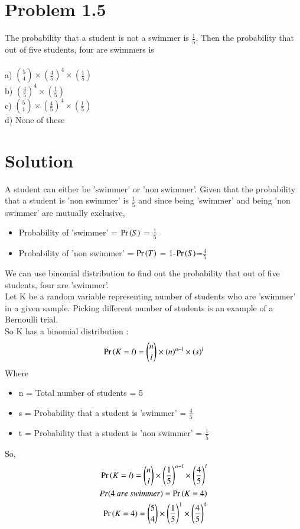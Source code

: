 \documentclass[journal,12pt,twocolumn]{IEEEtran}
\begin{document}
\section*{Problem 1.5}
The probability that a student is not a swimmer is $\frac{1}{5}$.
Then the probability that out of five students, four are swimmers is\\\\
a) ${{5}\choose{4}}\times\left(\frac{4}{5}\right)^4\times\left(\frac{1}{5}\right)$\\
b) $\left(\frac{4}{5}\right)^4\times\left(\frac{1}{5}\right)$\\
c) ${{5}\choose{1}}\times\left(\frac{4}{5}\right)^4\times\left(\frac{1}{5}\right)$\\
d) None of these 
\section*{Solution}
A student can either be 'swimmer' or 'non swimmer'. Given that the probability that a student is 'non swimmer' is $\frac{1}{5}$ and since being 'swimmer' and being 'non swimmer' are mutually exclusive,
\bigskip
\begin{itemize}
\item Probability of 'swimmer' = $\Pr\left(S\right)$ = \(\frac{1}{5}\)
\item Probability of 'non swimmer' = $\Pr\left(T\right)$ = 1-$\Pr\left(S\right)$=\( \frac{4}{5} \)
\end{itemize}
\bigskip
We can use binomial distribution to find out the probability that out of five students, four are 'swimmer'.\\
Let K be a random variable representing number of students who are 'swimmer' in a given sample. Picking different number of students is an example of a Bernoulli trial.\\
So K has a binomial distribution : 
\begin{align}
\Pr\left(K=l\right) = {{n}\choose{l}} \times (n)^{n-l} \times (s)^{l}\label{0.0.1}
\end{align}
Where
\begin{itemize}
    \item n = Total number of students = 5
    \item s = Probability that a student is 'swimmer' = \( \frac{4}{5} \)
    \item t = Probability that a student is 'non swimmer' = \( \frac{1}{5} \)
\end{itemize}
\bigskip
So,
\begin{align}
\Pr\left(K=l\right) = {{n}\choose{l}} \times \left(\frac{1}{5}\right)^{n-l} \times \left(\frac{4}{5}\right)^{l}\\
Pr(4\: are\: swimmer) = \Pr\left(K = 4\right)\\
\Pr\left(K = 4\right)={{5}\choose{4}} \times\left(\frac{1}{5}\right)^{1} \times \left(\frac{4}{5}\right)^{4}\\\notag
\end{align}
\end{document}
